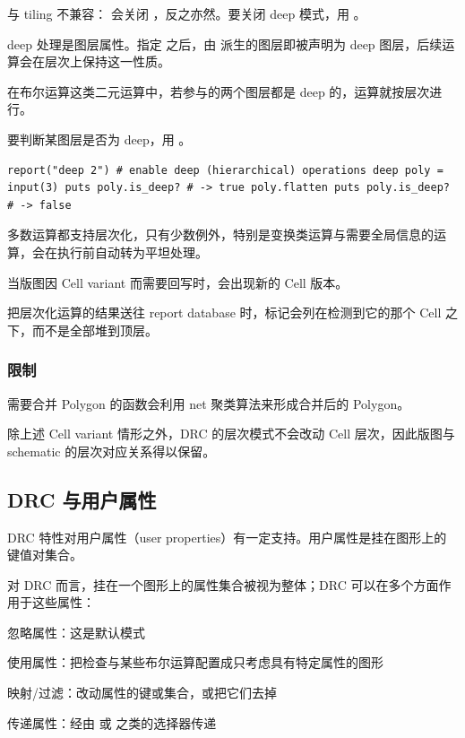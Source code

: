  与 tiling 不兼容： 会关闭 ，反之亦然。要关闭 deep 模式，用 。

deep 处理是图层属性。指定  之后，由  派生的图层即被声明为 deep 图层，后续运算会在层次上保持这一性质。

在布尔运算这类二元运算中，若参与的两个图层都是 deep 的，运算就按层次进行。

要判断某图层是否为 deep，用 。

\begin{lstlisting}
report("deep 2") # enable deep (hierarchical) operations deep poly = input(3) puts poly.is_deep? # -> true poly.flatten puts poly.is_deep? # -> false
\end{lstlisting}

多数运算都支持层次化，只有少数例外，特别是变换类运算与需要全局信息的运算，会在执行前自动转为平坦处理。

当版图因 Cell variant 而需要回写时，会出现新的 Cell 版本。

把层次化运算的结果送往 report database 时，标记会列在检测到它的那个 Cell 之下，而不是全部堆到顶层。

\subsubsection{限制}

需要合并 Polygon 的函数会利用 net 聚类算法来形成合并后的 Polygon。

除上述 Cell variant 情形之外，DRC 的层次模式不会改动 Cell 层次，因此版图与 schematic 的层次对应关系得以保留。

\subsection{DRC 与用户属性}

DRC 特性对用户属性（user properties）有一定支持。用户属性是挂在图形上的键值对集合。

对 DRC 而言，挂在一个图形上的属性集合被视为整体；DRC 可以在多个方面作用于这些属性：

\begin{kldesc}
\item 忽略属性：这是默认模式
\item 使用属性：把检查与某些布尔运算配置成只考虑具有特定属性的图形
\item 映射/过滤：改动属性的键或集合，或把它们去掉
\item 传递属性：经由  或  之类的选择器传递
\end{kldesc}

